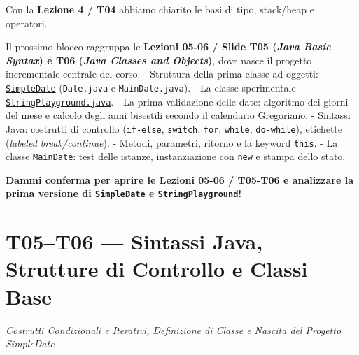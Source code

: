 \documentclass[11pt,a4paper,oneside]{report}
\newcommand{\passthrough}[1]{#1}
\begin{document}
\begin{studynote} Con la \textbf{Lezione 4 / T04} abbiamo chiarito le basi di
tipo, stack/heap e operatori.

Il prossimo blocco raggruppa le \textbf{Lezioni 05-06 / Slide T05
(\emph{Java Basic Syntax}) e T06 (\emph{Java Classes and Objects})},
dove nasce il progetto incrementale centrale del corso: - Struttura
della prima classe ad oggetti:
\href{file:///home/wally/Documenti/GitHub/Programmazione-II/25-26/Teoria-e-Esercitazioni/Codice-20260902/Lezioni05-06/SimpleDate}{\passthrough{\lstinline!SimpleDate!}}
(\passthrough{\lstinline!Date.java!} e
\passthrough{\lstinline!MainDate.java!}). - La classe sperimentale
\href{file:///home/wally/Documenti/GitHub/Programmazione-II/25-26/Teoria-e-Esercitazioni/Codice-20260902/Lezioni05-06/StringPlayground.java}{\passthrough{\lstinline!StringPlayground.java!}}.
- La prima validazione delle date: algoritmo dei giorni del mese e
calcolo degli anni bisestili secondo il calendario Gregoriano. -
Sintassi Java: costrutti di controllo
(\passthrough{\lstinline!if-else!}, \passthrough{\lstinline!switch!},
\passthrough{\lstinline!for!}, \passthrough{\lstinline!while!},
\passthrough{\lstinline!do-while!}), etichette (\emph{labeled
break/continue}). - Metodi, parametri, ritorno e la keyword
\passthrough{\lstinline!this!}. - La classe
\passthrough{\lstinline!MainDate!}: test delle istanze, instanziazione
con \passthrough{\lstinline!new!} e stampa dello stato.
\end{studynote}

\textbf{Dammi conferma per aprire le Lezioni 05-06 / T05-T06 e
analizzare la prima versione di \passthrough{\lstinline!SimpleDate!} e
\passthrough{\lstinline!StringPlayground!}!}

\newpage
\chapter[T05-T06 --- Sintassi Java, Strutture di Control]{T05–T06 --- Sintassi Java, Strutture di Controllo e Classi Base}
\label{chap:t05-t06}

{\small\sffamily\color{accentblue!80!black}\textit{Costrutti Condizionali e Iterativi, Definizione di Classe e Nascita del Progetto SimpleDate}}

\vspace{0.8em}
\end{document}
